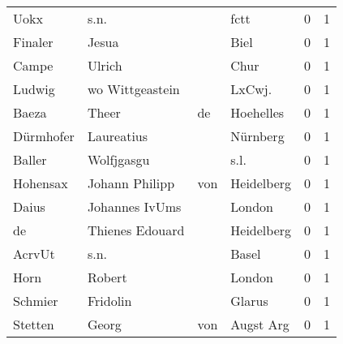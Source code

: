 \begin{center}
\begin{tiny}
\begin{longtabu}{llllrr}
                     Uokx &                               s.n. &             &                                        fctt &          0 &         1 \\
                  Finaler &                              Jesua &             &                                        Biel &          0 &         1 \\
                    Campe &                             Ulrich &             &                                        Chur &          0 &         1 \\
                   Ludwig &                    wo Wittgeastein &             &                                     LxCwj.  &          0 &         1 \\
                    Baeza &                              Theer &          de &                                   Hoehelles &          0 &         1 \\
                Dürmhofer &                         Laureatius &             &                                    Nürnberg &          0 &         1 \\
                   Baller &                         Wolfjgasgu &             &                                        s.l. &          0 &         1 \\
                 Hohensax &                     Johann Philipp &         von &                                  Heidelberg &          0 &         1 \\
                    Daius &                     Johannes IvUms &             &                                      London &          0 &         1 \\
                       de &                    Thienes Edouard &             &                                  Heidelberg &          0 &         1 \\
                   AcrvUt &                               s.n. &             &                                       Basel &          0 &         1 \\
                     Horn &                             Robert &             &                                      London &          0 &         1 \\
                  Schmier &                           Fridolin &             &                                      Glarus &          0 &         1 \\
                  Stetten &                              Georg &         von &                                   Augst Arg &          0 &         1 \\

\end{longtabu}
\end{tiny}
\end{center}
